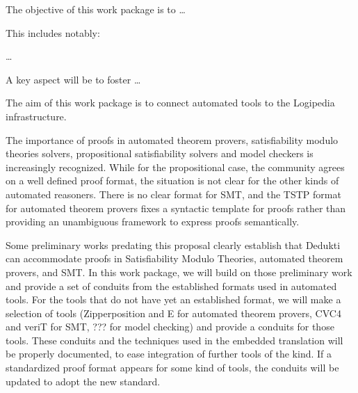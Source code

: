 \begin{workpackage}[id=atpetc,wphases=0-48,type=RTD,
  short=ATPs etc.,%
  title={ATP, SAT, SMT, Model checkers},
  lead=Lie,
  LieRM=10]


\begin{wpobjectives}
  The objective of this work package is to \ldots

This includes notably:
  \begin{compactitem}
  \item \ldots
  \end{compactitem}
  A key aspect will be to foster \ldots
\end{wpobjectives}


\begin{wpdescription}

  The aim of this work package is to connect automated tools to the Logipedia
  infrastructure.


The importance of proofs in automated theorem provers, satisfiability
modulo theories solvers, propositional satisfiability solvers and
model checkers is increasingly recognized.  While for the
propositional case, the community agrees on a well defined proof
format, the situation is not clear for the other kinds of automated
reasoners.  There is no clear format for SMT, and the TSTP format for
automated theorem provers fixes a syntactic template for proofs rather
than providing an unambiguous framework to express proofs
semantically.

Some preliminary works predating this proposal clearly establish that
Dedukti can accommodate proofs in Satisfiability Modulo Theories,
automated theorem provers, and SMT.  In this work package, we will
build on those preliminary work and provide a set of conduits from the
established formats used in automated tools. For the tools that do not
have yet an established format, we will make a selection of tools
(Zipperposition and E for automated theorem provers, CVC4 and veriT
for SMT, ??? for model checking) and provide a conduits for those
tools.  These conduits and the techniques used in the embedded
translation will be properly documented, to ease integration of
further tools of the kind.  If a standardized proof format appears for
some kind of tools, the conduits will be updated to adopt the new
standard.


\end{wpdescription}
\end{workpackage}
